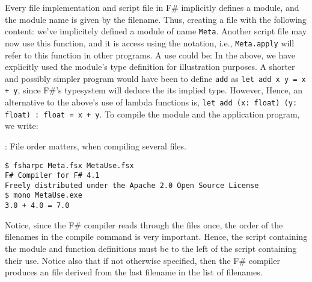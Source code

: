 Every file implementation and script file in F\# implicitly defines a module, and the module name is given by the filename. Thus, creating a file  with the following content:
%
%
we've implicitely defined a module of name \lstinline{Meta}. Another script file may now use this function, and it is access using the  notation, i.e., \lstinline{Meta.apply} will refer to this function in other programs. A use could be:
%
%
In the above, we have explicitly used the module's type definition for illustration purposes. A shorter and possibly simpler program would have been to define \lstinline{add} as \lstinline{let add x y = x + y}, since F\#'s typesystem will deduce the its implied type. However,  Hence, an alternative to the above's use of lambda functions is, \lstinline{let add (x: float) (y: float) : float = x + y}. To compile the module and the application program, we write:
\begin{codeNOutput}{: File order matters, when compiling several files.}
\begin{lstlisting}[language=console,escapechar=§]
$ fsharpc Meta.fsx MetaUse.fsx
F# Compiler for F# 4.1
Freely distributed under the Apache 2.0 Open Source License
$ mono MetaUse.exe 
3.0 + 4.0 = 7.0
\end{lstlisting}
\end{codeNOutput}
Notice, since the F\# compiler reads through the files once, the order of the filenames in the compile command is very important. Hence, the script containing the module and function definitions must be to the left of the script containing their use. Notice also that if not otherwise specified, then the F\# compiler produces an  file derived from the last filename in the list of filenames.

